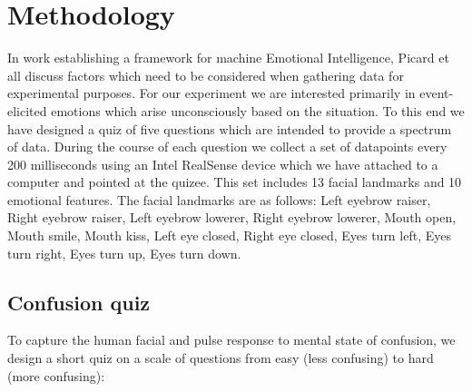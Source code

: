 \documentclass[12pt,letterpaper]{article}
\begin{document}
\section{Methodology}
In work establishing a framework for machine Emotional Intelligence, Picard et all \cite{picard2001toward} discuss factors which need to be considered when gathering data for experimental purposes.  For our experiment we are interested primarily in event-elicited emotions which arise unconsciously based on the situation.  To this end we have designed a quiz of five questions which are intended to provide a spectrum of data.  During the course of each question we collect a set of datapoints every 200 milliseconds using an Intel RealSense device which we have attached to a computer and pointed at the quizee.  This set includes 13 facial landmarks and 10 emotional features.  The facial landmarks are as follows: Left eyebrow raiser, Right eyebrow raiser, Left eyebrow lowerer, Right eyebrow lowerer, Mouth open, Mouth smile, Mouth kiss, Left eye closed, Right eye closed, Eyes turn left, Eyes turn right, Eyes turn up, Eyes turn down.

\subsection{Confusion quiz}

To capture the human facial and pulse response to mental state of confusion, we design a short quiz on a scale of questions from easy (less confusing) to hard (more confusing):
\end{document}
